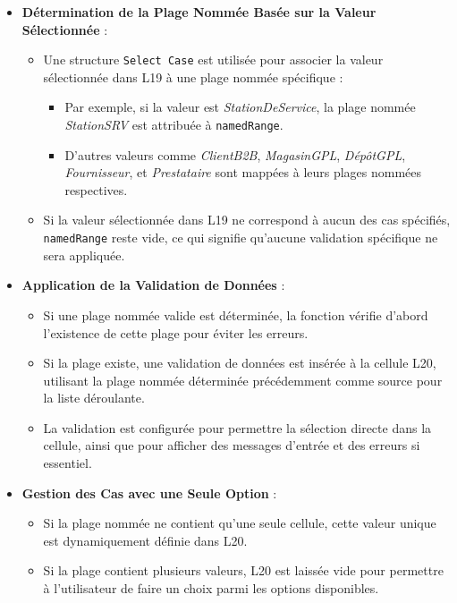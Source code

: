 \documentclass[a4paper, oneside, 12pt, final]{extreport}
\begin{document}
\begin{itemize}
    \item \textbf{Détermination de la Plage Nommée Basée sur la Valeur Sélectionnée} :
    \begin{itemize}
        \item Une structure \texttt{Select Case} est utilisée pour associer la valeur sélectionnée dans L19 à une plage nommée spécifique :
        \begin{itemize}
            \item Par exemple, si la valeur est \textit{StationDeService}, la plage nommée \textit{StationSRV} est attribuée à \texttt{namedRange}.
            \item D'autres valeurs comme \textit{ClientB2B}, \textit{MagasinGPL}, \textit{DépôtGPL}, \textit{Fournisseur}, et \textit{Prestataire} sont mappées à leurs plages nommées respectives.
        \end{itemize}
        \item Si la valeur sélectionnée dans L19 ne correspond à aucun des cas spécifiés, \texttt{namedRange} reste vide, ce qui signifie qu'aucune validation spécifique ne sera appliquée.
    \end{itemize}

    \item \textbf{Application de la Validation de Données} :
    \begin{itemize}
        \item Si une plage nommée valide est déterminée, la fonction vérifie d'abord l'existence de cette plage pour éviter les erreurs.
        \item Si la plage existe, une validation de données est insérée à la cellule L20, utilisant la plage nommée déterminée précédemment comme source pour la liste déroulante.
        \item La validation est configurée pour permettre la sélection directe dans la cellule, ainsi que pour afficher des messages d'entrée et des erreurs si essentiel.
    \end{itemize}

    \item \textbf{Gestion des Cas avec une Seule Option} :
    \begin{itemize}
        \item Si la plage nommée ne contient qu'une seule cellule, cette valeur unique est dynamiquement définie dans L20.
        \item Si la plage contient plusieurs valeurs, L20 est laissée vide pour permettre à l'utilisateur de faire un choix parmi les options disponibles.
    \end{itemize}


\end{itemize}
\end{document}
